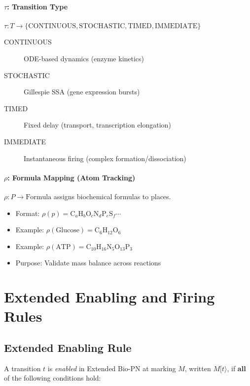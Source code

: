\paragraph{$\tau$: Transition Type}
$\tau: T \to \{\text{CONTINUOUS}, \text{STOCHASTIC}, \text{TIMED}, \text{IMMEDIATE}\}$

\begin{description}
    \item[CONTINUOUS] ODE-based dynamics (enzyme kinetics)
    \item[STOCHASTIC] Gillespie SSA (gene expression bursts)
    \item[TIMED] Fixed delay (transport, transcription elongation)
    \item[IMMEDIATE] Instantaneous firing (complex formation/dissociation)
\end{description}

\paragraph{$\rho$: Formula Mapping (Atom Tracking)}
$\rho: P \to \text{Formula}$ assigns biochemical formulas to places.

\begin{itemize}
    \item Format: $\rho(p) = \text{C}_a \text{H}_b \text{O}_c \text{N}_d \text{P}_e \text{S}_f \cdots$
    \item Example: $\rho(\text{Glucose}) = \text{C}_6\text{H}_{12}\text{O}_6$
    \item Example: $\rho(\text{ATP}) = \text{C}_{10}\text{H}_{16}\text{N}_5\text{O}_{13}\text{P}_3$
    \item Purpose: Validate mass balance across reactions
\end{itemize}

\section{Extended Enabling and Firing Rules}
\label{sec:extended-enabling-firing}

\subsection{Extended Enabling Rule}
\label{subsec:extended-enabling-rule}

A transition $t$ is \emph{enabled} in Extended Bio-PN at marking $M$, written $M[t\rangle$, if \textbf{all} of the following conditions hold:

